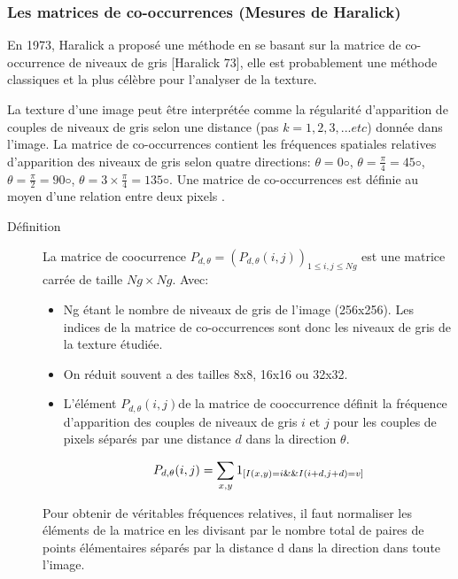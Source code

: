 \subsubsection{Les matrices de co-occurrences (Mesures de Haralick)}
 En 1973, Haralick a proposé une méthode en se basant sur la matrice de co-occurrence de niveaux de gris [Haralick 73], elle est probablement une méthode classiques et la plus célèbre pour l'analyser de la texture.
 
 La texture d'une image peut être interprétée comme la régularité d'apparition de couples de niveaux de gris selon une distance (pas $k=1, 2, 3, ...etc$) donnée dans l’image. La matrice de co-occurrences contient les fréquences spatiales relatives d’apparition des niveaux
 de gris selon quatre directions: $\theta = 0◦$,  $\theta =  \frac{\pi}{4} = 45◦$,  $\theta =  \frac{\pi}{2} = 90◦$,  $\theta =  3 \times \frac{\pi}{4} = 135◦$. Une matrice de co-occurrences est définie au moyen d’une relation entre deux pixels .\\

\begin{description}
	\item[Définition] La matrice de coocurrence $P_{d,\theta}=(P_{d,\theta}(i, j))_{1\leq i,j \leq Ng}$ est une matrice carrée de taille $Ng \times Ng$. Avec:
	\begin{itemize}
		\item Ng étant le nombre de niveaux de gris de l'image (256x256). Les indices de la matrice de co-occurrences sont
		donc les niveaux de gris de la texture étudiée.
		\item On réduit souvent a des tailles 8x8, 16x16 ou 32x32.
		\item L’élément $P_{d,\theta}(i, j)$de la matrice de cooccurrence définit la fréquence d'apparition des couples de niveaux de gris $i$ et $j$ pour les couples de pixels séparés par une distance $d$ dans la direction $\theta$.
		
		\begin{equation}
			P_{d,\theta}(i, j) = \sum_{x,y} 1_{ [I(x, y) = i \space \&\& \space  I(i + d, j + d) = v ]}
		\end{equation}
	\end{itemize} 
Pour obtenir de véritables fréquences relatives, il faut normaliser les éléments de la matrice en les divisant par le nombre total de paires de points élémentaires séparés par la distance d dans la direction dans toute l’image.
\end{description}

